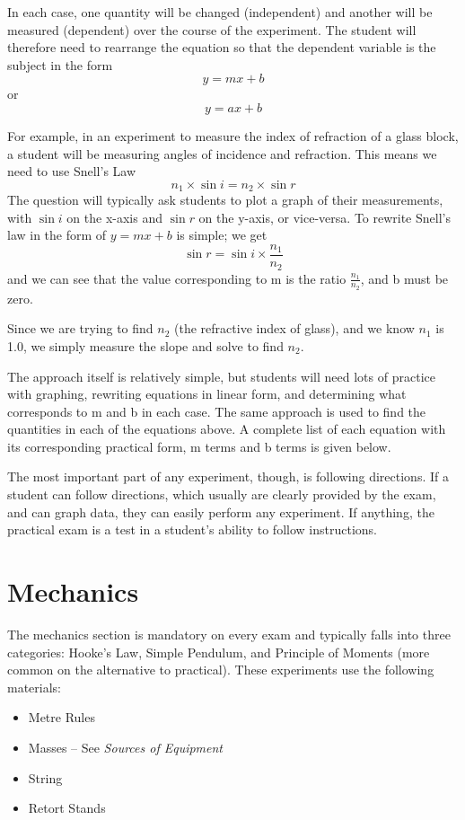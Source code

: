In each case, one quantity will be changed (independent) and another will be
measured (dependent) over the course of the experiment. The student will therefore need
to rearrange the equation so that the dependent variable is the subject in the form
$$y = mx + b$$ or $$y = ax + b$$

For example, in an experiment to measure the index of refraction of a glass block, a
student will be measuring angles of incidence and refraction. This means we need to use
Snell’s Law $$n_1 \times \sin{i} = n_2 \times \sin{r}$$
The question will typically ask students to plot a graph of their measurements, with $\sin{i}$
on the x-axis and $\sin{r}$ on the y-axis, or vice-versa. To rewrite Snell’s law in the form of
$y = mx + b$ is simple; we get $$\sin{r} = \sin{i} \times \frac{n_1}{n_2}$$
and we can see that the value corresponding to m is the ratio $\frac{n_1}{n_2}$, and b must be zero.

Since we are trying to find $n_2$ (the refractive index of glass), and we know $n_1$ is 1.0, we
simply measure the slope and solve to find $n_2$.

The approach itself is relatively simple, but students will need lots of practice
with graphing, rewriting equations in linear form, and determining what corresponds to m
and b in each case. The same approach is used to find the quantities in each of the
equations above. A complete list of each equation with its corresponding practical form,
m terms and b terms is given below.


The most important part of any experiment, though, is following directions. If a
student can follow directions, which usually are clearly provided by the exam, and can
graph data, they can easily perform any experiment. If anything, the practical exam is a
test in a student’s ability to follow instructions.

\section{Mechanics}

The mechanics section is mandatory on every exam and typically falls into three
categories: Hooke’s Law, Simple Pendulum, and Principle of Moments (more common
on the alternative to practical). These experiments use the following materials:
\begin{itemize}
\item{Metre Rules}
\item{Masses – See \textit{Sources of Equipment}}
\item{String}
\item{Retort Stands}
\end{itemize}

